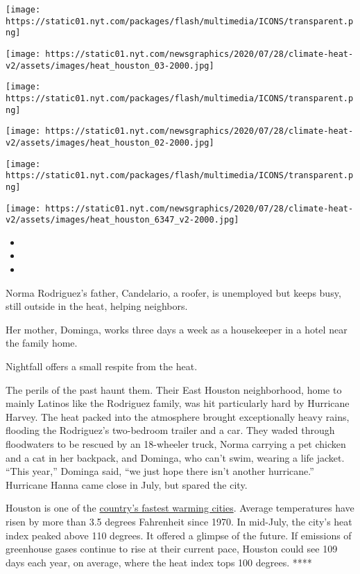 \texttt{[image: https://static01.nyt.com/packages/flash/multimedia/ICONS/transparent.png]}

\texttt{[image: https://static01.nyt.com/newsgraphics/2020/07/28/climate-heat-v2/assets/images/heat\_houston\_03-2000.jpg]}

\texttt{[image: https://static01.nyt.com/packages/flash/multimedia/ICONS/transparent.png]}

\texttt{[image: https://static01.nyt.com/newsgraphics/2020/07/28/climate-heat-v2/assets/images/heat\_houston\_02-2000.jpg]}

\texttt{[image: https://static01.nyt.com/packages/flash/multimedia/ICONS/transparent.png]}

\texttt{[image: https://static01.nyt.com/newsgraphics/2020/07/28/climate-heat-v2/assets/images/heat\_houston\_6347\_v2-2000.jpg]}

\begin{itemize}
\item
\item
\item
\end{itemize}

Norma Rodriguez's father, Candelario, a roofer, is unemployed but keeps
busy, still outside in the heat, helping neighbors.

Her mother, Dominga, works three days a week as a housekeeper in a hotel
near the family home.

Nightfall offers a small respite from the heat.

The perils of the past haunt them. Their East Houston neighborhood, home
to mainly Latinos like the Rodriguez family, was hit particularly hard
by Hurricane Harvey. The heat packed into the atmosphere brought
exceptionally heavy rains, flooding the Rodriguez's two-bedroom trailer
and a car. They waded through floodwaters to be rescued by an 18-wheeler
truck, Norma carrying a pet chicken and a cat in her backpack, and
Dominga, who can't swim, wearing a life jacket. ``This year,'' Dominga
said, ``we just hope there isn't another hurricane.'' Hurricane Hanna
came close in July, but spared the city.

Houston is one of the
\href{https://www.climatecentral.org/news/report-american-warming-us-heats-up-earth-da}{country's
fastest warming cities}. Average temperatures have risen by more than
3.5 degrees Fahrenheit since 1970. In mid-July, the city's heat index
peaked above 110 degrees. It offered a glimpse of the future. If
emissions of greenhouse gases continue to rise at their current pace,
Houston could see 109 days each year, on average, where the heat index
tops 100 degrees. ****

